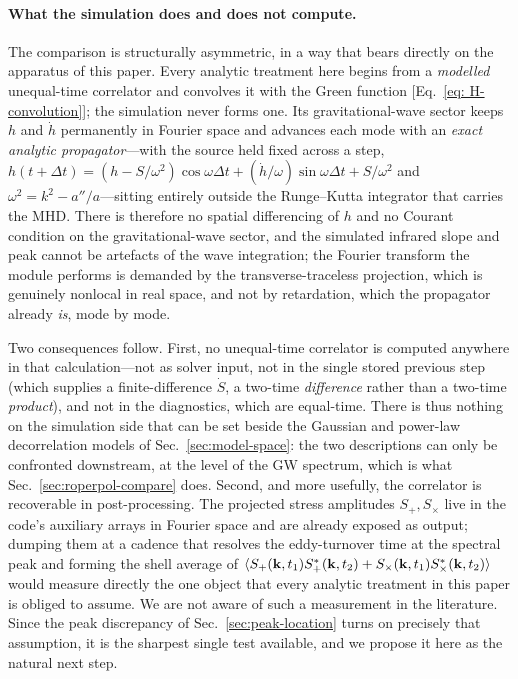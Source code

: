 \documentclass[10pt,prd,aps,nobibnotes,superscriptaddress,preprintnumbers,notitlepage]{revtex4-1}
\newcommand{\kb}{{\bf k}}
\begin{document}
\paragraph{What the simulation does and does not compute.} The comparison is structurally
asymmetric, in a way that bears directly on the apparatus of this paper. Every analytic
treatment here begins from a \emph{modelled} unequal-time correlator and convolves it with
the Green function [Eq.~\eqref{eq: H-convolution}]; the simulation never forms one. Its
gravitational-wave sector keeps $h$ and $\dot h$ permanently in Fourier space and advances
each mode with an \emph{exact analytic propagator}---with the source held fixed across a
step, $h(t+\Delta t)=(h-S/\omega^2)\cos\omega\Delta t+(\dot h/\omega)\sin\omega\Delta t
+S/\omega^2$ and $\omega^2=k^2-a''/a$---sitting entirely outside the Runge--Kutta integrator
that carries the MHD. There is therefore no spatial differencing of $h$ and no Courant
condition on the gravitational-wave sector, and the simulated infrared slope and peak cannot
be artefacts of the wave integration; the Fourier transform the module performs is demanded
by the transverse-traceless projection, which is genuinely nonlocal in real space, and not by
retardation, which the propagator already \emph{is}, mode by mode.

Two consequences follow. First, no unequal-time correlator is computed anywhere in that
calculation---not as solver input, not in the single stored previous step (which supplies a
finite-difference $\dot S$, a two-time \emph{difference} rather than a two-time
\emph{product}), and not in the diagnostics, which are equal-time. There is thus nothing on
the simulation side that can be set beside the Gaussian and power-law decorrelation models of
Sec.~\ref{sec:model-space}: the two descriptions can only be confronted downstream, at the
level of the GW spectrum, which is what Sec.~\ref{sec:roperpol-compare} does. Second, and
more usefully, the correlator is recoverable in post-processing. The projected stress
amplitudes $S_+ ,S_\times$ live in the code's auxiliary arrays in Fourier space and are
already exposed as output; dumping them at a cadence that resolves the eddy-turnover time at
the spectral peak and forming the shell average of $\langle
S_+(\kb,t_1)S_+^\ast(\kb,t_2)+S_\times(\kb,t_1)S_\times^\ast(\kb,t_2)\rangle$ would measure
directly the one object that every analytic treatment in this paper is obliged to assume. We
are not aware of such a measurement in the literature. Since the peak discrepancy of
Sec.~\ref{sec:peak-location} turns on precisely that assumption, it is the sharpest single
test available, and we propose it here as the natural next step.
\end{document}

